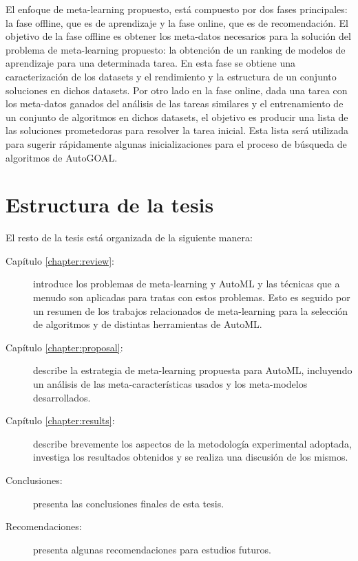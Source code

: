 El enfoque de meta-learning propuesto, está compuesto por dos fases principales: la fase offline, que es de aprendizaje y la fase online, que es de recomendación. El objetivo de la fase offline es obtener los meta-datos necesarios para la solución del problema de meta-learning propuesto: la obtención de un ranking de modelos de aprendizaje para una determinada tarea. En esta fase se obtiene una caracterización de los datasets y el rendimiento y la estructura de un conjunto soluciones en dichos datasets. Por otro lado en la fase online, dada una tarea con los meta-datos ganados del análisis de las tareas similares y el entrenamiento de un conjunto de algoritmos en dichos datasets, el objetivo es producir una lista de las soluciones prometedoras para resolver la tarea inicial. Esta lista será utilizada para sugerir rápidamente algunas inicializaciones para el proceso de búsqueda de algoritmos de AutoGOAL.



\section*{Estructura de la tesis}

El resto de la tesis está organizada de la siguiente manera:

\begin{description}
	\item[Capítulo \ref{chapter:review}:] introduce los problemas de meta-learning y AutoML y las técnicas que a menudo son aplicadas para tratas con estos problemas. Esto es seguido por un resumen de los trabajos relacionados de meta-learning para la selección de algoritmos y de distintas herramientas de AutoML.
	\item[Capítulo \ref{chapter:proposal}:] describe la estrategia de meta-learning propuesta para AutoML, incluyendo un análisis de las meta-características usados y los meta-modelos desarrollados.
	\item[Capítulo \ref{chapter:results}:] describe brevemente los aspectos de la metodología experimental adoptada, investiga los resultados obtenidos y se realiza una discusión de los mismos.
	\item[Conclusiones:] presenta las conclusiones finales  de esta tesis.
	\item[Recomendaciones:] presenta algunas recomendaciones para estudios futuros.
\end{description}